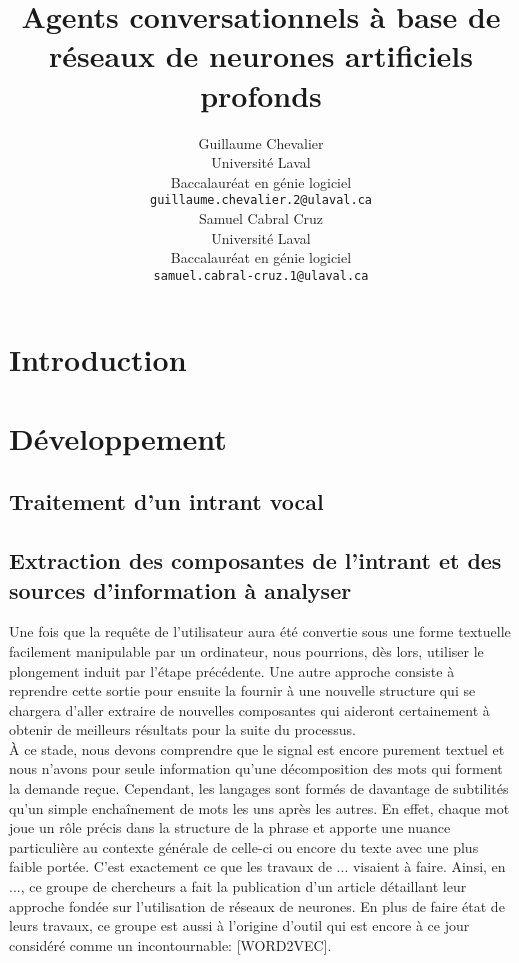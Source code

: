 \documentclass[11pt]{article}
\title{Agents conversationnels à base de réseaux de neurones artificiels profonds}
\author{Guillaume Chevalier \\
  Université Laval \\ Baccalauréat en génie logiciel \\
  {\tt \small guillaume.chevalier.2@ulaval.ca} \\\And
  Samuel Cabral Cruz \\
  Université Laval \\ Baccalauréat en génie logiciel \\
  {\tt \small samuel.cabral-cruz.1@ulaval.ca} \\}
\date{}
\begin{document}
\maketitle

\begin{abstract}

\end{abstract}

\section{Introduction}


\section{Développement}
\subsection{Traitement d'un intrant vocal}

\subsection{Extraction des composantes de l'intrant et des sources d'information à analyser}
Une fois que la requête de l'utilisateur aura été convertie sous une forme textuelle facilement manipulable par un ordinateur, nous pourrions, dès lors, utiliser le plongement induit par l'étape précédente. Une autre approche consiste à reprendre cette sortie pour ensuite la fournir à une nouvelle structure qui se chargera d'aller extraire de nouvelles composantes qui aideront certainement à obtenir de meilleurs résultats pour la suite du processus. \\

À ce stade, nous devons comprendre que le signal est encore purement textuel et nous n'avons pour seule information qu'une décomposition des mots qui forment la demande reçue. Cependant, les langages sont formés de davantage de subtilités qu'un simple enchaînement de mots les uns après les autres. En effet, chaque mot joue un rôle précis dans la structure de la phrase et apporte une nuance particulière au contexte générale de celle-ci ou encore du texte avec une plus faible portée. C'est exactement ce que les travaux de ... visaient à faire. Ainsi, en ..., ce groupe de chercheurs a fait la publication d'un article détaillant leur approche fondée sur l'utilisation de réseaux de neurones. En plus de faire état de leurs travaux, ce groupe est aussi à l'origine d'outil qui est encore à ce jour considéré comme un incontournable: [WORD2VEC]. \\
\end{document}
